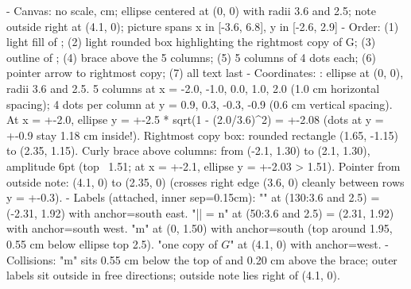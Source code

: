 \begin{proofWrapper}
\begin{content}
\begin{hidden}
- Canvas: no scale, cm; ellipse  centered at (0, 0) with radii 3.6 and 2.5; note outside right at (4.1, 0); picture spans x in [-3.6, 6.8], y in [-2.6, 2.9]
- Order: (1) light fill of ; (2) light rounded box highlighting the rightmost copy of G; (3) outline of ; (4) brace above the 5 columns; (5) 5 columns of 4 dots each; (6) pointer arrow to rightmost copy; (7) all text last
- Coordinates:
  : ellipse at (0, 0), radii 3.6 and 2.5.
  5 columns at x = -2.0, -1.0, 0.0, 1.0, 2.0 (1.0 cm horizontal spacing); 4 dots per column at y = 0.9, 0.3, -0.3, -0.9 (0.6 cm vertical spacing).
  At x = +-2.0, ellipse y = +-2.5 * sqrt(1 - (2.0/3.6)^2) = +-2.08 (dots at y = +-0.9 stay 1.18 cm inside!).
  Rightmost copy box: rounded rectangle (1.65, -1.15) to (2.35, 1.15).
  Curly brace above columns: from (-2.1, 1.30) to (2.1, 1.30), amplitude 6pt (top ~1.51; at x = +-2.1, ellipse y = +-2.03 > 1.51).
  Pointer from outside note: (4.1, 0) to (2.35, 0) (crosses right edge (3.6, 0) cleanly between rows y = +-0.3).
- Labels (attached, inner sep=0.15cm):
  "" at (130:3.6 and 2.5) = (-2.31, 1.92) with anchor=south east.
  "|| = n" at (50:3.6 and 2.5) = (2.31, 1.92) with anchor=south west.
  "m" at (0, 1.50) with anchor=south (top around 1.95, 0.55 cm below ellipse top 2.5).
  "one copy of $G$" at (4.1, 0) with anchor=west.
- Collisions: "m" sits 0.55 cm below the top of  and 0.20 cm above the brace; outer labels sit outside  in free directions; outside note lies right of (4.1, 0).
\end{hidden}
\begin{center}
\end{center}
\end{content}
\end{proofWrapper}
